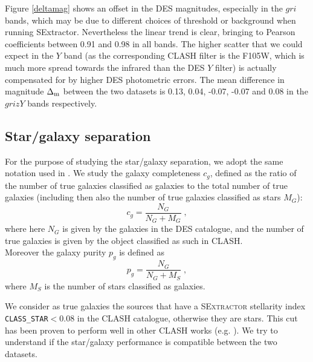 {Figure \ref{deltamag} shows an offset in the DES magnitudes, especially in the $gri$ bands, which may be due to different choices of threshold or background when running SExtractor. Nevertheless the linear trend is clear, bringing to Pearson coefficients between 0.91 and 0.98 in all bands. The higher scatter that we could expect in the $Y$ band (as the corresponding CLASH filter is the F105W, which is much more spread towards the infrared than the DES $Y$ filter) is actually compensated for by higher DES photometric errors. The mean difference in magnitude $\Delta_{\rm m}$ between the two datasets is 0.13, 0.04, -0.07, -0.07 and 0.08 in the $grizY$ bands respectively.

\subsection{Star/galaxy separation}

For the purpose of studying the star/galaxy separation, we adopt the same notation used in \citet{soumagnac}. We study the galaxy completeness $c_g$, defined as the ratio of the number of true galaxies classified as galaxies to the total number of true galaxies (including then also the number of true galaxies classified as stars $M_G$):
\begin{equation}
c_g=\frac{N_G}{N_G+M_G}\;,
\end{equation}
where here $N_G$ is given by the galaxies in the DES catalogue, and the number of true galaxies is given by the object classified as such in CLASH.\\
Moreover the galaxy purity $p_g$ is defined as
\begin{equation}
p_g=\frac{N_G}{N_G+M_S}\;,
\end{equation}
where $M_S$ is the number of stars classified as galaxies.

We consider as true galaxies the sources that have a \textsc{SExtractor} stellarity index \texttt{CLASS\_STAR}$<0.08$ in the CLASH catalogue, otherwise they are stars. This cut has been proven to perform well in other CLASH works (e.g. \citealt{jouvel}). We try to understand if the star/galaxy performance is compatible between the two datasets.\\  

}
